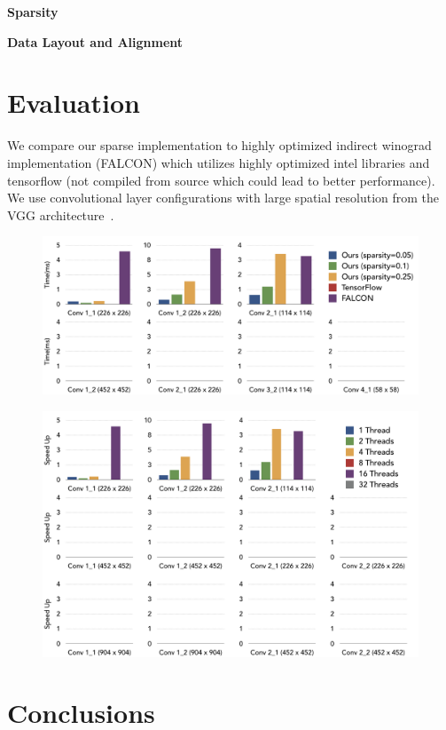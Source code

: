 \documentclass{article}
\begin{document}
\textbf{Sparsity}

\textbf{Data Layout and Alignment}

\section{Evaluation}
We compare our sparse implementation to highly optimized indirect winograd
implementation (FALCON) which utilizes highly optimized intel libraries and
tensorflow (not compiled from source which could lead to better performance).
We use convolutional layer configurations with large spatial resolution from 
the VGG architecture~\cite{simonyan2014very}.

\begin{figure}[t]
	\centering
	\includegraphics[width=\textwidth]{falcon_tf}
    \label{fig:falcon_tf}
\end{figure}

\begin{figure}[t]
	\centering
	\includegraphics[width=\textwidth]{scaling}
    \label{fig:scaling}
\end{figure}
\label{sec:eval}

\section{Conclusions}
\label{sec:conclusion}


\nocite{*}
{}
\end{document}
